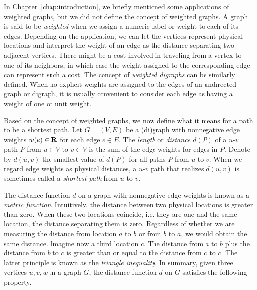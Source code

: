 In Chapter~\ref{chap:introduction}, we briefly mentioned some
applications of weighted graphs, but we did not define the concept of
weighted graphs. A graph is said to be
\emph{weighted} when we assign a numeric label
or weight to each of its edges. Depending on the application, we can
let the vertices represent physical locations and interpret the weight
of an edge as the distance separating two adjacent
vertices. There might be a cost involved in traveling from a vertex
to one of its neighbors, in which case the weight assigned to the
corresponding edge can represent such a cost. The concept
of \emph{weighted digraphs} can be similarly
defined. When no explicit weights are assigned to the edges of an
undirected graph or digraph, it is usually convenient to consider each
edge as having a weight of one or unit weight.

Based on the concept of weighted graphs, we now
define what it means for a path to be a shortest
path. Let $G = (V,E)$ be a (di)graph with
nonnegative edge weights $w(e) \in \mathbf{R}$ for
each edge $e \in E$. The \emph{length} or
\emph{distance} $d(P)$ of a $u$-$v$ path $P$ from
$u \in V$ to $v \in V$ is the sum of the edge weights for edges in
$P$. Denote by $d(u,v)$ the smallest value of $d(P)$ for all paths $P$
from $u$ to $v$. When we regard edge weights as physical
distances, a $u$-$v$ path that realizes $d(u,v)$ is
sometimes called a \emph{shortest path} from $u$
to $v$.

The distance function $d$ on a graph with
nonnegative edge weights is known as a
\emph{metric function}. Intuitively, the
distance between two physical locations is greater
than zero. When these two locations coincide, i.e. they are one and
the same location, the distance separating them is zero. Regardless of
whether we are measuring the distance from location $a$ to $b$ or from
$b$ to $a$, we would obtain the same distance. Imagine now a third
location $c$. The distance from $a$ to $b$ plus the distance from $b$
to $c$ is greater than or equal to the distance from $a$ to $c$. The
latter principle is known as the
\emph{triangle inequality}. In summary,
given three vertices $u,v,w$ in a graph $G$, the distance
function $d$ on $G$ satisfies the following
property.

